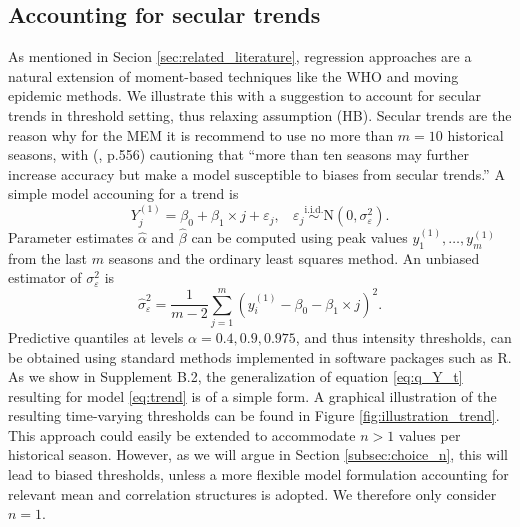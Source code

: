 \documentclass[12pt]{article}
\begin{document}
\subsection{Accounting for secular trends}
\label{subsec:regression}
\label{subsec:trends}

As mentioned in Secion \ref{sec:related_literature}, regression approaches are a natural extension of moment-based techniques like the WHO and moving epidemic methods. We illustrate this with a suggestion to account for secular trends in threshold setting, thus relaxing assumption (HB). Secular trends are the reason why for the MEM it is recommend to use no more than $m = 10$ historical seasons, with \citeauthor{Vega2013} (\citeyear{Vega2013}, p.556) cautioning that ``more than ten seasons may further increase accuracy but make a model susceptible to biases from secular trends.'' A simple model accouning for a trend is
\begin{equation}
Y_j^{(1)} = \beta_0 + \beta_1 \times j + \varepsilon_j, \ \ \ \ \varepsilon_j \stackrel{\text{i.i.d.}}{\sim} \text{N}(0, \sigma^2_\varepsilon).\label{eq:trend}
\end{equation}
Parameter estimates $\hat{\alpha}$ and $\hat{\beta}$ can be computed using peak values $y_1^{(1)}, \dots, y_m^{(1)}$ from the last $m$ seasons and the ordinary least squares method. An unbiased estimator of ${\sigma}^2_\varepsilon$ is
$$
\hat{\sigma}^2_\varepsilon = \frac{1}{m - 2} \sum_{j = 1}^m (y^{(1)}_i - \beta_0 - \beta_1 \times j)^2.
$$
Predictive quantiles at levels $\alpha = 0.4, 0.9, 0.975$, and thus intensity thresholds, can be obtained using standard methods implemented in software packages such as R. As we show in Supplement B.2, the generalization of equation \eqref{eq:q_Y_t} resulting for model \eqref{eq:trend} is of a simple form. A graphical illustration of the resulting time-varying thresholds can be found in Figure \ref{fig:illustration_trend}. This approach could easily be extended to accommodate $n > 1$ values per historical season. However, as we will argue in Section \ref{subsec:choice_n}, this will lead to biased thresholds, unless a more flexible model formulation accounting for relevant mean and correlation structures is adopted. We therefore only consider $n = 1$.
\end{document}
